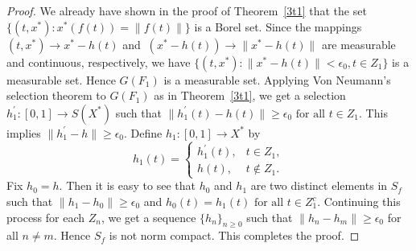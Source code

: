 \documentclass[10pt,a4paper]{amsart}
\begin{document}
\begin{proof}
We already have shown in the proof of Theorem~\ref{3t1} that the set $\{(t,x^*):x^*(f(t))=\|f(t)\|\}$ is a Borel set. Since the mappings $(t,x^*)\rightarrow x^*-h(t)$ and $\ (x^*-h(t))\rightarrow\|x^*-h(t)\|$ are measurable and continuous, respectively, we have $\{(t,x^*):\|x^*-h(t)\|<\epsilon_{0}, t \in Z_1\}$ is a measurable set. Hence $ G(F_1) $ is a measurable set. Applying Von Neumann's selection theorem to $G(F_{1})$ as in Theorem~\ref{3t1}, we get a selection $h^{'}_1: [0,1] \to S(X^*)$ such that $\|h^{'}_1(t)- h(t)\|\geq\epsilon_{0}\text{ for all  } t \in Z_1$. This implies $ \|h^{'}_1- h\|\geq \epsilon_{0}$. Define $ h_1: [0,1] \to X^* $ by
\[
h_{1}(t) =
\begin{cases} 
h^{'}_{1}(t), & t \in Z_{1} , \\
h(t), & t \notin Z_{1}.
\end{cases}
\]
Fix $h_{0}=h$. Then it is easy to see that $h_{0}$ and  $h_1$ are two distinct elements in $ S_f $ such that $\|h_1- h_{0}\|\geq\epsilon_{0}$ and $h_{0}(t)=h_{1}(t) \text{ for all } t\in Z_{1}^{c}$.
Continuing this process for each $Z_{n}$, we get a sequence $\{h_n\}_{n\geq0}$ such that $\|h_n-h_m\|\geq\epsilon_{0}$ for all $n\neq m$. Hence $S_{f}$ is not norm compact. This completes the proof.
\end{proof}
\end{document}
